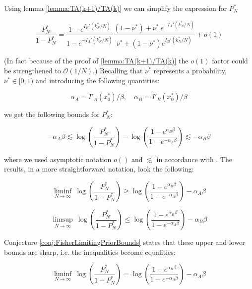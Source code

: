 \documentclass{article}
\theoremstyle{definition}
\begin{document}
Using lemma \ref{lemma:TA(k+1)/TA(k)} we can simplify the expression for $P^*_N$

\begin{equation}
    \frac{P^*_N}{1-P^*_N} = 
    \frac
    {1 - e^{I_B'(k^*_N/N)}}
    {1 - e^{-I_A'(k^*_N/N)}}
    \frac
    {(1-\nu^*) + \nu^* \ e^{-I_A'(k^*_N/N)}}
    {\nu^* + (1-\nu^*) e^{I_B'(k^*_N/N)}} + o(1)
\end{equation}

(In fact because of the proof of \ref{lemma:TA(k+1)/TA(k)} the $o(1)$ factor could be strengthened to $\mathcal{O}(1/N)$.)
Recalling that $\nu^*$ represents a probability, $\nu^* \in [0,1)$ and introducing the following quantities:

\begin{equation}
    \alpha_A = I'_A(x_0^*)/\beta, \quad
    \alpha_B = I'_B(x_0^*)/\beta
\end{equation}

we get the following bounds for $P^*_N$:

\begin{equation}
    - \alpha_A \beta 
    \lesssim 
    \log \left ( \frac{P^*_N}{1-P^*_N} \right ) - 
    \log \left ( \frac{1-e^{\alpha_B \beta}}
    {1-e^{-\alpha_A \beta}} \right )
    \lesssim
    - \alpha_B \beta
\end{equation}

where we used asymptotic notation $o()$ and $\lesssim$ in accordance with \cite{book:BabaiDiscreteMathematics}.
The results, in a more straightforward notation, look the following:

\begin{equation}
    \liminf_{N \to \infty} 
    \ \log \left ( \frac{P^*_N}{1-P^*_N} \right )
    \ge
    \log \left ( \frac{1-e^{\alpha_B \beta}}
    {1-e^{-\alpha_A \beta}} \right ) 
    -\alpha_A \beta 
\end{equation}

\begin{equation}
    \limsup_{N \to \infty} 
    \ \log \left ( \frac{P^*_N}{1-P^*_N} \right )
    \le
    \log \left ( \frac{1-e^{\alpha_B \beta}}
    {1-e^{-\alpha_A \beta}} \right ) 
    -\alpha_B \beta 
\end{equation}

Conjecture \ref{conj:FisherLimitingPriorBounds} states that these upper and lower bounds are sharp, i.e. the inequalities become equalities:

\begin{equation}
    \label{deriv:liminfPN}
    \liminf_{N \to \infty} 
    \ \log \left ( \frac{P^*_N}{1-P^*_N} \right )
    =
    \log \left ( \frac{1-e^{\alpha_B \beta}}
    {1-e^{-\alpha_A \beta}} \right ) 
    -\alpha_A \beta 
\end{equation}
\end{document}
